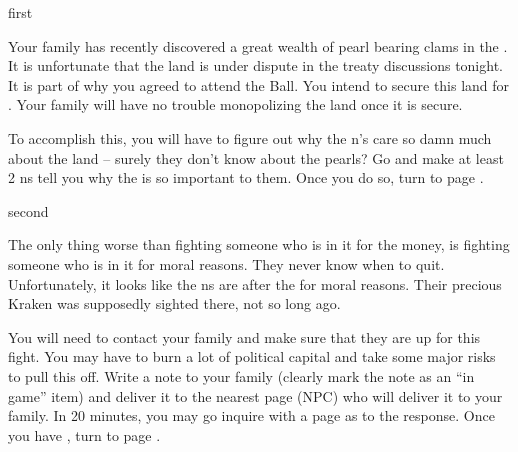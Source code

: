\documentclass[greennotebook]{NeptuneBall}
\begin{document}

\startnotebook{\nGazaStrip{}}

\begin{page}{first}

Your family has recently discovered a great wealth of pearl bearing clams in the \pGazaStrip{}. It is unfortunate that the land is under dispute in the treaty discussions tonight. It is part of why you agreed to attend the \cExExKing{} Ball. You intend to secure this land for \pAtlantis{}. Your family will have no trouble monopolizing the land once it is secure. 

To accomplish this, you will have to figure out why the \pPacifica{}n's care so damn much about the land -- surely they don't know about the pearls? Go and make at least 2 \pPacifica{}ns tell you why the \pGazaStrip{} is so important to them. Once you do so, turn to page .

\end{page}

\begin{page}{second}

The only thing worse than fighting someone who is in it for the money, is fighting someone who is in it for moral reasons. They never know when to quit. Unfortunately, it looks like the \pPacifica{}ns are after the \pGazaStrip{} for moral reasons. Their precious Kraken was supposedly sighted there, not so long ago.

You will need to contact your family and make sure that they are up for this fight. You may have to burn a lot of political capital and take some major risks to pull this off. Write a note to your family (clearly mark the note as an ``in game'' item) and deliver it to the nearest page (NPC) who will deliver it to your family. In 20 minutes, you may go inquire with a page as to the response. Once you have \iCipherLetter{}, turn to page .

\end{page}
\end{document}
